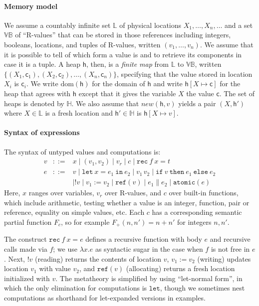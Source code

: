 \documentclass[nocopyrightspace,preprint]{sigplanconf}
\newcommand{\keywd}[1]{\mathtt{#1}}
\newcommand{\myread}[1]{!{#1}}
\newcommand{\myref}[1]{\keywd{ref}(#1)}
\newcommand{\mylet}{\keywd{let}}
\newcommand{\labs}{\mathbb{L}}
\newcommand{\dom}[1]{\mathrm{dom}({#1})}
\newcommand{\vfix}[3]{\keywd{rec}\:{#1}\:{#2} = {#3}}
\newcommand{\letin}[2]{\keywd{let}\:{#1}\!=\!{#2}\:\keywd{in}\:}
\newcommand{\assign}[2]{{#1}:={#2}}
\newcommand{\myif}[3]{\keywd{if}\ #1\ \keywd{then}\ #2\
  \keywd{else}\ #3}
\newcommand{\myatomic}[1]{\keywd{atomic}(#1)}
\newcommand{\mypar}[2]{#1 \| #2}
\newcommand{\Locs}{\ensuremath{\labs}}
\newcommand{\new}{\ensuremath{\mathit{new}}}
\newcommand{\Stores}{\ensuremath{\mathbb{H}}}
\newcommand{\cloc}{\ensuremath{X}\xspace}
\newcommand\heap{\ensuremath{\mathsf{h}}\xspace}
\newcommand\h{\heap}
\newcommand{\ValuesB}{\mathbb{VB}}
\newcommand\cval{\ensuremath{\mathsf{c}}\xspace}
\begin{document}
\paragraph{Memory model}
We assume a countably infinite set $\labs$ of physical locations
$\cloc_1, \ldots, \cloc_n, \ldots$ and a set $\ValuesB$ of
``R-values'' that can be stored in those references including
integers, booleans, locations, and tuples of R-values, written $(v_1,
\ldots, v_n)$.  We assume that it is possible to tell of which form a
value is and to retrieve its components in case it is a tuple.  A heap $\h$, then, is a \emph{finite map} from $\labs$ to $\ValuesB$, written
$\{(\cloc_1, \cval_1),(\cloc_2, \cval_2), \ldots, (\cloc_n,
\cval_n)\}$, specifying that the value stored in location $\cloc_i$ is $\cval_i$. We write $\dom{\h}$ for the domain of $\h$ and
write $\h[\cloc{\mapsto} \cval]$ for the heap that agrees with $\h$
except that it gives the variable $\cloc$ the value $\cval$. The set
of heaps is denoted by $\Stores$.  We also assume that $\new(\heap,v)$
yields a pair $(\cloc,\heap')$ where $\cloc\in\Locs$ is a fresh
location and $\heap'\in\Stores$ is $\heap[\cloc{\mapsto}v]$. 


\paragraph{Syntax of expressions}
The syntax of untyped values and computations is:
\[
 \begin{array}{lcl}
v & ::= & x \mid (v_1,v_2) \mid v_r\mid c \mid
\vfix{f}{x}{t} \\
e &::=& v\mid \letin{x}{e_1}{e_2}\mid v_1\,v_2 \mid
\myif{v}{e_1}{e_2} \\&&
\mid \myread{v}\mid \assign{v_1}{v_2}\mid \myref{v}
 \mid \mypar{e_1}{e_2} \mid
\myatomic{e}
 \end{array}
\]
Here, $x$ ranges over variables, $v_r$ over R-values, and $c$
over built-in functions, which include arithmetic, testing
whether a value is an integer, function, pair or reference,
equality on simple values, etc. Each $c$ has a corresponding semantic
partial function $F_c$, so for example $F_+(n,n')=n+n'$ for integers $n,n'$.

The construct $\vfix{f}{x}{e}$ defines a recursive function with body
$e$ and recursive calls made via $f$; we use $\lambda x.e$ as
syntactic sugar in the case when 
$f$ is not free in $e$. Next, $\myread{v}$
(reading) returns the contents of location $v$, $\assign{v_1}{v_2}$
(writing) updates location $v_1$ with value $v_2$, and $\myref{v}$
(allocating) returns a fresh location initialized with $v$. The
metatheory is simplified by using ``let-normal form'', in which the
only elimination for computations is $\mylet$, though we sometimes nest
computations as shorthand for let-expanded versions in examples.
 
\end{document}
